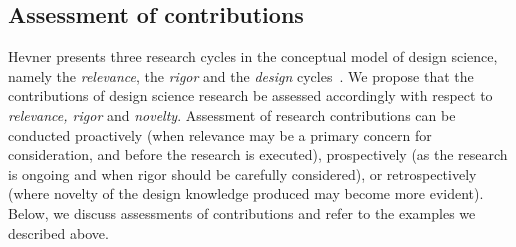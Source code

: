 \documentclass[graybox]{svmult}
\newcommand{\per}[1]{\textcolor{cyan}{{\it [Per says: #1]}}}
\newcommand{\per}[1]{}
\begin{document}
%
%



\subsection{Assessment of contributions}
\label{sec:assessment}

Hevner presents three research cycles in the conceptual model of design science, namely the \emph{relevance}, the \emph{rigor} and the \emph{design} cycles~\cite{Hevner2007}. We propose that the contributions of design science research be assessed accordingly with respect to \emph{relevance, rigor} and \emph{novelty}. 
Assessment of research contributions can be conducted proactively (when relevance may be a primary concern for consideration, and before the research is executed), prospectively (as the research is ongoing and when rigor should be carefully considered), or retrospectively (where novelty of the design knowledge produced may become more evident).
Below, we discuss assessments of contributions and refer to the examples we described above.
\end{document}
